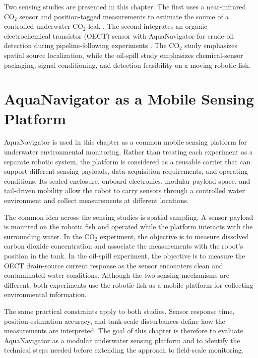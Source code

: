\documentclass{uhcoethesis}
\begin{document}
Two sensing studies are presented in this chapter. The first uses a near-infrared \mbox{CO$_2$} sensor and position-tagged measurements to estimate the source of a controlled underwater \mbox{CO$_2$} leak \cite{Masood2025CO2}. The second integrates an organic electrochemical transistor (OECT) sensor with AquaNavigator for crude-oil detection during pipeline-following experiments \cite{Masood2026OilSpill}. The \mbox{CO$_2$} study emphasizes spatial source localization, while the oil-spill study emphasizes chemical-sensor packaging, signal conditioning, and detection feasibility on a moving robotic fish.

\section{AquaNavigator as a Mobile Sensing Platform}

AquaNavigator is used in this chapter as a common mobile sensing platform for underwater environmental monitoring. Rather than treating each experiment as a separate robotic system, the platform is considered as a reusable carrier that can support different sensing payloads, data-acquisition requirements, and operating conditions. Its sealed enclosure, onboard electronics, modular payload space, and tail-driven mobility allow the robot to carry sensors through a controlled water environment and collect measurements at different locations.

The common idea across the sensing studies is spatial sampling. A sensor payload is mounted on the robotic fish and operated while the platform interacts with the surrounding water. In the \mbox{CO$_2$} experiment, the objective is to measure dissolved carbon dioxide concentration and associate the measurements with the robot's position in the tank. In the oil-spill experiment, the objective is to measure the OECT drain-source current response as the sensor encounters clean and contaminated water conditions. Although the two sensing mechanisms are different, both experiments use the robotic fish as a mobile platform for collecting environmental information.

The same practical constraints apply to both studies. Sensor response time, position-estimation accuracy, and tank-scale disturbances define how the measurements are interpreted. The goal of this chapter is therefore to evaluate AquaNavigator as a modular underwater sensing platform and to identify the technical steps needed before extending the approach to field-scale monitoring.
\end{document}
